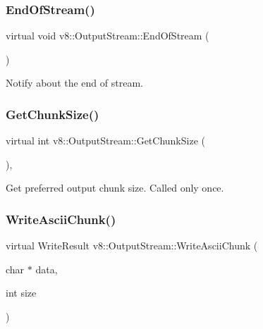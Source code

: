\subsubsection{\texorpdfstring{End\+Of\+Stream()}{EndOfStream()}}
{\footnotesize\ttfamily virtual void v8\+::\+Output\+Stream\+::\+End\+Of\+Stream (\begin{DoxyParamCaption}{ }\end{DoxyParamCaption})\hspace{0.3cm}{\ttfamily [pure virtual]}}

Notify about the end of stream. \mbox{\label{classv8_1_1OutputStream_a93bdaa790cbd66a7283fad2cca3f48f7}} 
\subsubsection{\texorpdfstring{Get\+Chunk\+Size()}{GetChunkSize()}}
{\footnotesize\ttfamily virtual int v8\+::\+Output\+Stream\+::\+Get\+Chunk\+Size (\begin{DoxyParamCaption}{ }\end{DoxyParamCaption})\hspace{0.3cm}{\ttfamily [inline]}, {\ttfamily [virtual]}}

Get preferred output chunk size. Called only once. \mbox{\label{classv8_1_1OutputStream_a42adc62ebe43d00159f80328538f217f}} 
\subsubsection{\texorpdfstring{Write\+Ascii\+Chunk()}{WriteAsciiChunk()}}
{\footnotesize\ttfamily virtual Write\+Result v8\+::\+Output\+Stream\+::\+Write\+Ascii\+Chunk (\begin{DoxyParamCaption}\item[{char $\ast$}]{data,  }\item[{int}]{size }\end{DoxyParamCaption})\hspace{0.3cm}{\ttfamily [pure virtual]}}

